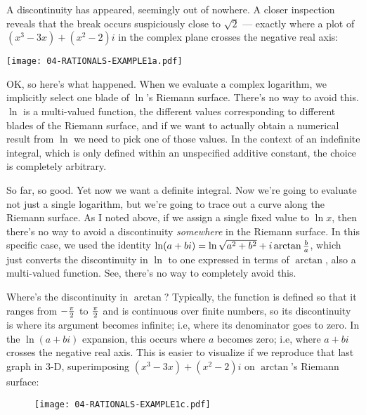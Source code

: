 \vfill\eject

A discontinuity has appeared, seemingly out of nowhere.  A closer
inspection reveals that the break occurs suspiciously close to
$\sqrt{2}$ --- exactly where a plot of $(x^3-3x)+(x^2-2)i$ in
the complex plane crosses the negative real axis:

\begin{center}
\texttt{[image: 04-RATIONALS-EXAMPLE1a.pdf]}
\end{center}

OK, so here's what happened.  When we evaluate a complex logarithm, we
implicitly select one blade of $\ln$'s Riemann surface.  There's no
way to avoid this.  $\ln$ is a multi-valued function, the different
values corresponding to different blades of the Riemann surface, and
if we want to actually obtain a numerical result from $\ln$ we need to
pick one of those values.  In the context of an indefinite integral,
which is only defined within an unspecified additive constant, the
choice is completely arbitrary.

So far, so good.  Yet now we want a definite integral.  Now we're
going to evaluate not just a single logarithm, but we're going to
trace out a curve along the Riemann surface.  As I noted above, if we
assign a single fixed value to $\ln x$, then there's no way to avoid a
discontinuity {\it somewhere} in the Riemann surface.  In this
specific case, we used the identity $\ln(a+bi) = \ln\sqrt{a^2+b^2}
+i\arctan{b\over a}$, which just converts the discontinuity in $\ln$
to one expressed in terms of $\arctan$, also a multi-valued function.
See, there's no way to completely avoid this.

Where's the discontinuity in $\arctan$?  Typically, the function is
defined so that it ranges from $-{\pi\over2}$ to ${\pi\over2}$ and is
continuous over finite numbers, so its discontinuity is where its
argument becomes infinite; i.e, where its denominator goes to zero.
In the $\ln(a+bi)$ expansion, this occurs where $a$ becomes zero; i.e,
where $a+bi$ crosses the negative real axis.  This is easier to visualize
if we reproduce that last graph in 3-D, superimposing $(x^3-3x)+(x^2-2)i$
on $\arctan$'s Riemann surface:

\begin{figure}[h]
\begin{center}
\texttt{[image: 04-RATIONALS-EXAMPLE1c.pdf]}
\end{center}
\end{figure}

